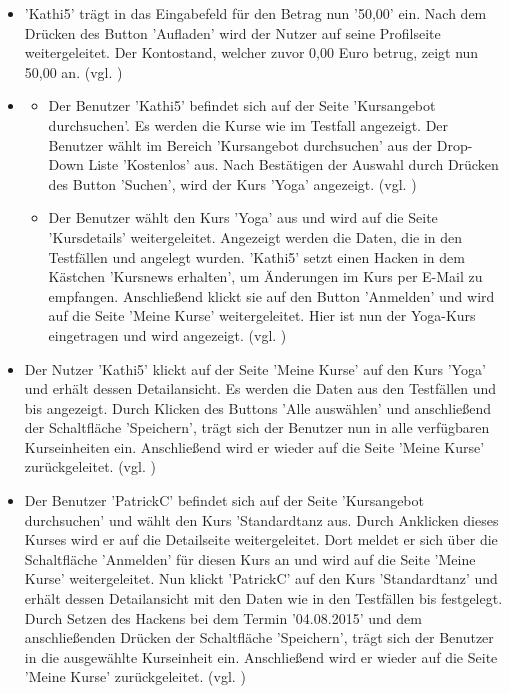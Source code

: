 \documentclass[a4paper]{scrreprt}
\begin{document}
\begin{itemize}
\begin{itemize}
					\item 'Kathi5' trägt in das Eingabefeld für den Betrag nun '50,00' ein. Nach dem Drücken des Button 'Aufladen' wird der Nutzer auf seine Profilseite weitergeleitet. Der Kontostand, welcher zuvor 0,00 Euro betrug, zeigt nun 50,00 an.  (vgl. )
				\end{itemize}
			\end{itemize}
			
			\begin{itemize}
				\item {} 
					\begin{itemize}
						\item Der Benutzer 'Kathi5' befindet sich auf der Seite 'Kursangebot durchsuchen'. Es werden die Kurse wie im Testfall  angezeigt. Der Benutzer wählt im Bereich 'Kursangebot durchsuchen' aus der Drop-Down Liste 'Kostenlos' aus. Nach Bestätigen der Auswahl durch Drücken des Button 'Suchen', wird der Kurs 'Yoga' angezeigt. (vgl. )
						
						\item Der Benutzer wählt den Kurs 'Yoga' aus und wird auf die Seite 'Kursdetails' weitergeleitet. Angezeigt werden die Daten, die in den Testfällen  und  angelegt wurden. 'Kathi5' setzt einen Hacken in dem Kästchen 'Kursnews erhalten', um Änderungen im Kurs per E-Mail zu empfangen. Anschließend klickt sie auf den Button 'Anmelden' und wird auf die Seite 'Meine Kurse' weitergeleitet. Hier ist nun der Yoga-Kurs eingetragen und wird angezeigt. (vgl. )
					\end{itemize}
				
				\item {} 
				Der Nutzer 'Kathi5'	klickt auf der Seite 'Meine Kurse' auf den Kurs 'Yoga' und erhält dessen Detailansicht. Es werden die Daten aus den Testfällen   und  bis  angezeigt. Durch Klicken des Buttons 'Alle auswählen' und anschließend der Schaltfläche 'Speichern', trägt sich der Benutzer nun in alle verfügbaren Kurseinheiten ein. Anschließend wird er wieder auf die Seite 'Meine Kurse' zurückgeleitet. (vgl. )
				
				\item {} 
				Der Benutzer 'PatrickC' befindet sich auf der Seite 'Kursangebot durchsuchen' und wählt den Kurs 'Standardtanz aus. Durch Anklicken dieses Kurses wird er auf die Detailseite weitergeleitet. Dort meldet er sich über die Schaltfläche 'Anmelden' für diesen Kurs an und wird auf die Seite 'Meine Kurse' weitergeleitet. Nun klickt 'PatrickC' auf den Kurs 'Standardtanz' und erhält dessen Detailansicht mit den Daten wie in den Testfällen  bis  festgelegt. Durch Setzen des Hackens bei dem Termin '04.08.2015' und dem anschließenden Drücken der Schaltfläche 'Speichern', trägt sich der Benutzer in die ausgewählte Kurseinheit ein. Anschließend wird er wieder auf die Seite 'Meine Kurse' zurückgeleitet. (vgl. )
				

\end{itemize}
\end{document}
